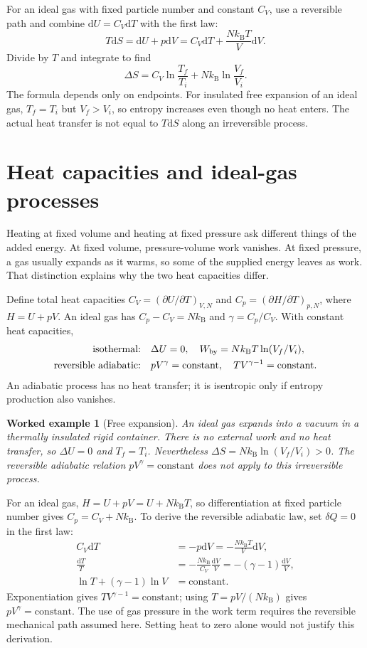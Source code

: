 \documentclass[11pt,oneside]{book}
\newcommand{\dd}{\mathrm{d}}
\newcommand{\kb}{k_{\mathrm B}}
\theoremstyle{reviewstyle}
\newtheorem{example}{Worked example}[chapter]
\begin{document}
For an ideal gas with fixed particle number and constant $C_V$, use a reversible path and combine $\dd U=C_V\dd T$ with the first law:
\begin{equation}
T\dd S=\dd U+p\dd V
=C_V\dd T+\frac{N\kb T}{V}\dd V.
\end{equation}
Divide by $T$ and integrate to find
\begin{equation}
\Delta S=C_V\ln\frac{T_f}{T_i}+N\kb\ln\frac{V_f}{V_i}.
\end{equation}
The formula depends only on endpoints. For insulated free expansion of an ideal gas, $T_f=T_i$ but $V_f>V_i$, so entropy increases even though no heat enters. The actual heat transfer is not equal to $T\dd S$ along an irreversible process.

\section{Heat capacities and ideal-gas processes}
Heating at fixed volume and heating at fixed pressure ask different things of the added energy. At fixed volume, pressure-volume work vanishes. At fixed pressure, a gas usually expands as it warms, so some of the supplied energy leaves as work. That distinction explains why the two heat capacities differ.

Define total heat capacities $C_V=(\partial U/\partial T)_{V,N}$ and $C_p=(\partial H/\partial T)_{p,N}$, where $H=U+pV$. An ideal gas has $C_p-C_V=N\kb$ and $\gamma=C_p/C_V$. With constant heat capacities,
\begin{align}
\text{isothermal:}\quad &\Delta U=0,\quad W_{\rm by}=N\kb T\ln(V_f/V_i),\\
\text{reversible adiabatic:}\quad &pV^\gamma=\text{constant},\quad TV^{\gamma-1}=\text{constant}.
\end{align}
An adiabatic process has no heat transfer; it is isentropic only if entropy production also vanishes.
\begin{example}[Free expansion]
An ideal gas expands into a vacuum in a thermally insulated rigid container. There is no external work and no heat transfer, so $\Delta U=0$ and $T_f=T_i$. Nevertheless $\Delta S=N\kb\ln(V_f/V_i)>0$. The reversible adiabatic relation $pV^\gamma=\text{constant}$ does not apply to this irreversible process.
\end{example}

For an ideal gas, $H=U+pV=U+N\kb T$, so differentiation at fixed particle number gives $C_p=C_V+N\kb$. To derive the reversible adiabatic law, set $\delta Q=0$ in the first law:
\begin{align}
C_V\dd T&=-p\dd V=-\frac{N\kb T}{V}\dd V,\\
\frac{\dd T}{T}&=-\frac{N\kb}{C_V}\frac{\dd V}{V}
=-(\gamma-1)\frac{\dd V}{V},\\
\ln T+(\gamma-1)\ln V&=\text{constant}.
\end{align}
Exponentiation gives $TV^{\gamma-1}=\text{constant}$; using $T=pV/(N\kb)$ gives $pV^\gamma=\text{constant}$. The use of gas pressure in the work term requires the reversible mechanical path assumed here. Setting heat to zero alone would not justify this derivation.
\end{document}
